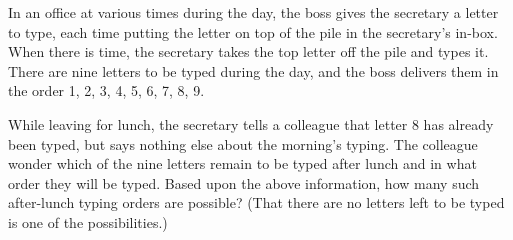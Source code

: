 In an office at various times during the day, the boss gives the secretary a letter to type, each time putting the letter on top of the pile in the secretary's in-box.  When there is time, the secretary takes the top letter off the pile and types it.  There are nine letters to be typed during the day, and the boss delivers them in the order 1, 2, 3, 4, 5, 6, 7, 8, 9.

While leaving for lunch, the secretary tells a colleague that letter 8 has already been typed, but says nothing else about the morning's typing.  The colleague wonder which of the nine letters remain to be typed after lunch and in what order they will be typed.  Based upon the above information, how many such after-lunch typing orders are possible?  (That there are no letters left to be typed is one of the possibilities.)